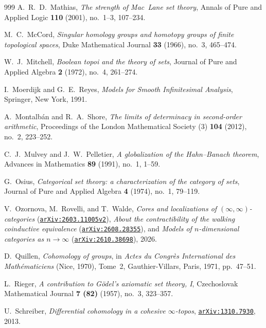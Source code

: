\documentclass[10pt,twoside,openright]{book}
\theoremstyle{crmplain}
\theoremstyle{crmdef}
\theoremstyle{crmremark}
\begin{document}
\begin{thebibliography}{999}
A.~R.~D.~Mathias,
\emph{The strength of Mac~Lane set theory},
Annals of Pure and Applied Logic \textbf{110} (2001), no.~1--3, 107--234.

M.~C.~McCord,
\emph{Singular homology groups and homotopy groups of finite topological spaces},
Duke Mathematical Journal \textbf{33} (1966), no.~3, 465--474.

W.~J.~Mitchell,
\emph{Boolean topoi and the theory of sets},
Journal of Pure and Applied Algebra \textbf{2} (1972), no.~4, 261--274.

I.~Moerdijk and G.~E.~Reyes,
\emph{Models for Smooth Infinitesimal Analysis},
Springer, New York, 1991.

A.~Montalb\'an and R.~A.~Shore,
\emph{The limits of determinacy in second-order arithmetic},
Proceedings of the London Mathematical Society (3) \textbf{104} (2012), no.~2, 223--252.

C.~J.~Mulvey and J.~W.~Pelletier,
\emph{A globalization of the Hahn--Banach theorem},
Advances in Mathematics \textbf{89} (1991), no.~1, 1--59.

G.~Osius,
\emph{Categorical set theory: a characterization of the category of sets},
Journal of Pure and Applied Algebra \textbf{4} (1974), no.~1, 79--119.

V.~Ozornova, M.~Rovelli, and T.~Walde,
\emph{Cores and localizations of $(\infty, \infty)$-categories} (\href{https://arxiv.org/abs/2603.11005v2}{\texttt{arXiv:2603.11005v2}}),
\emph{About the contractibility of the walking coinductive equivalence} (\href{https://arxiv.org/abs/2608.28355}{\texttt{arXiv:2608.28355}}), and
\emph{Models of $n$-dimensional categories as $n \to \infty$} (\href{https://arxiv.org/abs/2610.38698}{\texttt{arXiv:2610.38698}}), 2026.

D.~Quillen,
\emph{Cohomology of groups},
in \emph{Actes du Congr\`es International des Math\'ematiciens} (Nice, 1970), Tome~2, Gauthier-Villars, Paris, 1971, pp.~47--51.

L.~Rieger,
\emph{A contribution to G\"odel's axiomatic set theory, I},
Czechoslovak Mathematical Journal \textbf{7 (82)} (1957), no.~3, 323--357.

U.~Schreiber,
\emph{Differential cohomology in a cohesive $\infty$-topos},
\href{https://arxiv.org/abs/1310.7930}{\texttt{arXiv:1310.7930}}, 2013.


\end{thebibliography}
\end{document}
